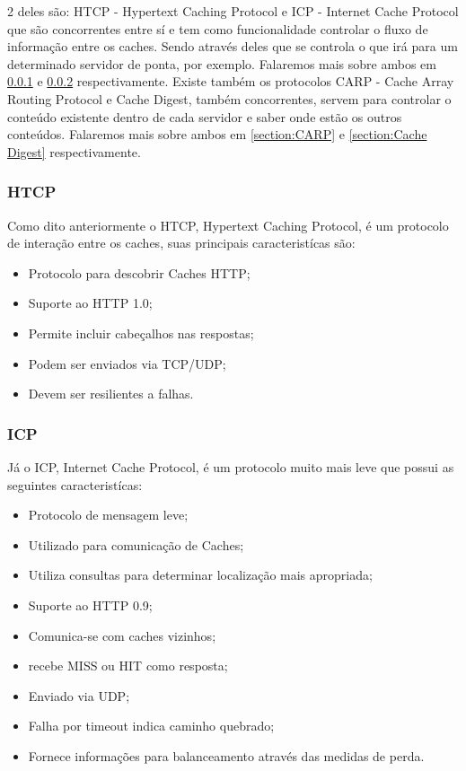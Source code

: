 2 deles s\~ao: HTCP - Hypertext Caching Protocol e ICP - Internet Cache Protocol que s\~ao concorrentes entre s\'i e tem como funcionalidade controlar o fluxo de informa\c{c}\~ao entre os caches. Sendo atrav\'es deles que se controla o que ir\'a para um determinado servidor de ponta, por exemplo. Falaremos mais sobre ambos em \ref{section:HTCP} e \ref{section:ICP} respectivamente.
\newline Existe tamb\'em os protocolos CARP -  Cache Array Routing Protocol e Cache Digest, tamb\'em concorrentes, servem para controlar o conte\'udo existente dentro de cada servidor e saber onde est\~ao os outros conte\'udos. Falaremos mais sobre ambos em \ref{section:CARP} e \ref{section:Cache Digest} respectivamente.

\subsubsection{HTCP}
\label{section:HTCP}
Como dito anteriormente o HTCP, Hypertext Caching Protocol, \'e um protocolo de intera\c{c}\~ao entre os caches, suas principais caracterist\'icas s\~ao:
\begin{itemize}
\item Protocolo para descobrir Caches HTTP;
\item Suporte ao HTTP 1.0;
\item Permite incluir cabeçalhos nas respostas;
\item Podem ser enviados via TCP/UDP;
\item Devem ser resilientes a falhas.
\end{itemize}

\subsubsection{ICP}
\label{section:ICP}
J\'a o ICP, Internet Cache Protocol, \'e um protocolo muito mais leve que possui as seguintes caracterist\'icas:
\begin{itemize}
\item Protocolo de mensagem leve;
\item Utilizado para comunica\c{c}\~ao de Caches;
\item Utiliza consultas para determinar localiza\c{c}\~ao mais apropriada;
\item Suporte ao HTTP 0.9;
\item Comunica-se com caches vizinhos;
\item recebe MISS ou HIT como resposta;
\item Enviado via UDP;
\item Falha por timeout indica caminho quebrado;
\item Fornece informa\c{c}\~oes para balanceamento atrav\'es das medidas de perda.
\end{itemize}

